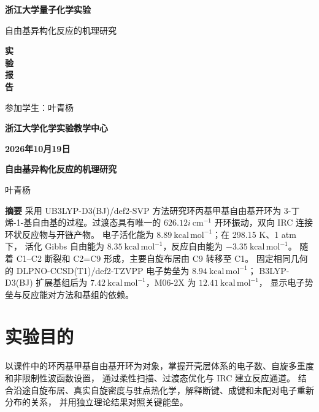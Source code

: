 \documentclass[UTF8,a4paper,12pt,fontset=fandol]{ctexart}
\newcommand{\kcal}{\mathrm{kcal\,mol^{-1}}}
\begin{document}
\begin{titlepage}
\centering\vspace*{1cm}
{\fontsize{24pt}{36pt}\selectfont\bfseries 浙江大学量子化学实验\par}
\vspace{1cm}
{\sffamily\fontsize{18pt}{24pt}\selectfont 自由基异构化反应的机理研究\par}
\vspace{.7cm}
{\sffamily\fontsize{22pt}{28pt}\selectfont\bfseries 实\\[.32cm]验\\[.32cm]报\\[.32cm]告\par}
\vfill
{\fontsize{14pt}{21pt}\selectfont 参加学生：叶青杨\par}
\vspace{1cm}
{\fontsize{18pt}{24pt}\selectfont\bfseries 浙江大学化学实验教学中心\par}
\vspace{.5cm}
{\fontsize{18pt}{24pt}\selectfont\bfseries 2026年10月19日\par}
\end{titlepage}
\setcounter{page}{1}\fontsize{12pt}{18pt}\selectfont
\begin{center}
{\sffamily\fontsize{15pt}{22pt}\selectfont\bfseries 自由基异构化反应的机理研究\par}
\vspace{.4em}叶青杨
\end{center}

\noindent\textbf{摘要}\quad
采用 UB3LYP-D3(BJ)/def2-SVP 方法研究环丙基甲基自由基开环为
3-丁烯-1-基自由基的过程。过渡态具有唯一的 $626.12i\ \mathrm{cm^{-1}}$
开环振动，双向 IRC 连接环状反应物与开链产物。
电子活化能为 $8.89\ \kcal$；在 298.15 K、1 atm 下，
活化 Gibbs 自由能为 $8.35\ \kcal$，反应自由能为 $-3.35\ \kcal$。
随着 C1--C2 断裂和 C2=C9 形成，主要自旋布居由 C9 转移至 C1。
固定相同几何的 DLPNO-CCSD(T1)/def2-TZVPP 电子势垒为 $8.94\ \kcal$；
B3LYP-D3(BJ) 扩展基组后为 $7.42\ \kcal$，M06-2X 为 $12.41\ \kcal$，
显示电子势垒与反应能对方法和基组的依赖。

\section{实验目的}
以课件中的环丙基甲基自由基开环为对象，掌握开壳层体系的电子数、自旋多重度和非限制性波函数设置，
通过柔性扫描、过渡态优化与 IRC 建立反应通道。
结合沿途自旋布居、真实自旋密度与驻点热化学，解释断键、成键和未配对电子重新分布的关系，
并用独立理论结果对照关键能垒\cite{course}。
\end{document}
